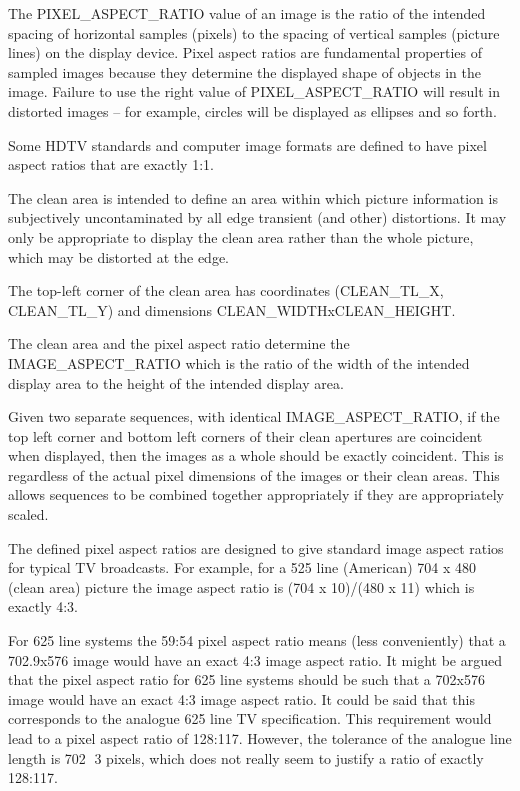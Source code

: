 The PIXEL\_ASPECT\_RATIO value of an image is the ratio of the intended
spacing of horizontal samples (pixels) to the spacing of vertical
samples (picture lines) on the display device. Pixel aspect ratios are
fundamental properties of sampled images because they determine the
displayed shape of objects in the image. Failure to use the right value
of PIXEL\_ASPECT\_RATIO will result in distorted images – for example,
circles will be displayed as ellipses and so forth. 


Some HDTV standards and computer image formats are defined to have pixel
aspect ratios that are exactly 1:1.

The clean area is intended to define an area within which picture
information is subjectively uncontaminated by all edge transient (and
other) distortions. It may only be appropriate to display the clean area
rather than the whole picture, which may be distorted at the edge. 

The top-left corner of the clean area has coordinates (CLEAN\_TL\_X,
CLEAN\_TL\_Y) and dimensions CLEAN\_WIDTHxCLEAN\_HEIGHT.

The clean area and the pixel aspect ratio determine the
IMAGE\_ASPECT\_RATIO which is the ratio of the width of the intended
display area to the height of the intended display area. 

Given two separate sequences, with identical IMAGE\_ASPECT\_RATIO, if the
top left corner and bottom left corners of their clean apertures are
coincident when displayed, then the images as a whole should be exactly
coincident. This is regardless of the actual pixel dimensions of the
images or their clean areas. This allows sequences to be combined
together appropriately if they are appropriately scaled.


The defined pixel aspect ratios are designed to give standard image
aspect ratios for typical TV broadcasts. For example, for a 525 line
(American) 704 x 480 (clean area)  picture the image aspect ratio is
(704 x 10)/(480 x 11) which is exactly 4:3.


For 625 line systems the 59:54 pixel aspect ratio means (less
conveniently) that a 702.9x576 image would have an exact 4:3 image
aspect ratio. It might be argued that the pixel aspect ratio for 625
line systems should be such that a 702x576 image would have an exact 4:3
image aspect ratio. It could be said that this corresponds to the
analogue 625 line TV specification. This requirement would lead to a
pixel aspect ratio of 128:117. However, the tolerance of the analogue
line length is 702 3 pixels, which does not really seem to justify a
ratio of exactly 128:117.

